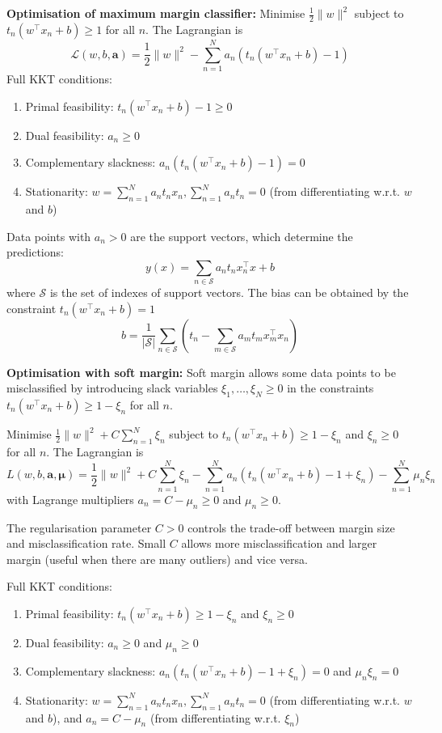 \documentclass[12pt]{article}
\begin{document}
\textbf{Optimisation of maximum margin classifier:} Minimise $\frac{1}{2} \|w\|^2$ subject to $t_n (w^\top x_n + b) \geq 1$ for all $n$. The Lagrangian is
$$
\mathcal{L}(w, b, \boldsymbol{a}) = \frac{1}{2} \|w\|^2 - \sum_{n=1}^N a_n (t_n (w^\top x_n + b) - 1)
$$
Full KKT conditions:
\begin{enumerate}
    \item Primal feasibility: $t_n (w^\top x_n + b) - 1 \geq 0$
    \item Dual feasibility: $a_n \geq 0$
    \item Complementary slackness: $a_n (t_n (w^\top x_n + b) - 1) = 0$
    \item Stationarity: $w = \sum_{n=1}^N a_n t_n x_n, \sum_{n=1}^N a_n t_n = 0$ (from differentiating w.r.t. $w$ and $b$)
\end{enumerate}
Data points with $a_n > 0$ are the support vectors, which determine the predictions:
$$
y(x) = \sum_{n \in \mathcal{S}} a_n t_n x_n^\top x + b
$$
where $\mathcal{S}$ is the set of indexes of support vectors. The bias can be obtained by the constraint $t_n (w^\top x_n + b) = 1$
$$
b = \frac{1}{|\mathcal{S}|} \sum_{n \in \mathcal{S}} \left(t_n - \sum_{m \in \mathcal{S}} a_m t_m x_m^\top x_n\right)
$$

\textbf{Optimisation with soft margin:} Soft margin allows some data points to be misclassified by introducing slack variables $\xi_1, \dots, \xi_N \geq 0$ in the constraints $t_n (w^\top x_n + b) \geq 1 - \xi_n$ for all $n$. 

Minimise $\frac{1}{2} \|w\|^2 + C \sum_{n=1}^N \xi_n$ subject to $t_n (w^\top x_n + b) \geq 1 - \xi_n$ and $\xi_n \geq 0$ for all $n$. The Lagrangian is
$$
L(w, b, \boldsymbol{a}, \boldsymbol{\mu}) = \frac{1}{2} \|w\|^2 + C \sum_{n=1}^N \xi_n - \sum_{n=1}^N a_n (t_n (w^\top x_n + b) - 1 + \xi_n) - \sum_{n=1}^N \mu_n \xi_n
$$
with Lagrange multipliers $a_n = C - \mu_n \geq 0$ and $\mu_n \geq 0$. 

The regularisation parameter $C > 0$ controls the trade-off between margin size and misclassification rate. Small $C$ allows more misclassification and larger margin (useful when there are many outliers) and vice versa.

Full KKT conditions:
\begin{enumerate}
    \item Primal feasibility: $t_n (w^\top x_n + b) \geq 1 - \xi_n$ and $\xi_n \geq 0$
    \item Dual feasibility: $a_n \geq 0$ and $\mu_n \geq 0$
    \item Complementary slackness: $a_n (t_n (w^\top x_n + b) - 1 + \xi_n) = 0$ and $\mu_n \xi_n = 0$
    \item Stationarity: $w = \sum_{n=1}^N a_n t_n x_n, \sum_{n=1}^N a_n t_n = 0$ (from differentiating w.r.t. $w$ and $b$), and $a_n = C - \mu_n$ (from differentiating w.r.t. $\xi_n$)
\end{enumerate}
\end{document}
